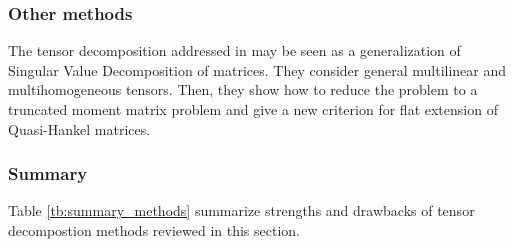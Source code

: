 \documentclass[letterpaper,12pt]{article}
\begin{document}



\subsubsection{Other methods}

 The tensor decomposition addressed in \cite{Bernardi2013} may be seen as a generalization of Singular Value Decomposition of matrices. They consider general multilinear and multihomogeneous tensors. Then, they show how to reduce the problem to a truncated moment matrix problem and give a new criterion for flat extension of Quasi-Hankel matrices. 
 
 
\subsubsection{Summary} 

Table \ref{tb:summary_methods} summarize strengths and drawbacks of tensor decompostion methods reviewed in this section.
 
\end{document}
